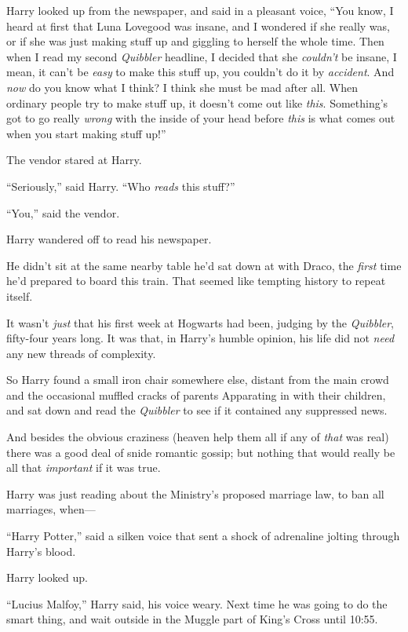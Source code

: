 Harry looked up from the newspaper, and said in a pleasant voice, “You know, I heard at first that Luna Lovegood was insane, and I wondered if she really was, or if she was just making stuff up and giggling to herself the whole time. Then when I read my second \emph{Quibbler} headline, I decided that she \emph{couldn’t} be insane, I mean, it can’t be \emph{easy} to make this stuff up, you couldn’t do it by \emph{accident}. And \emph{now} do you know what I think? I think she must be mad after all. When ordinary people try to make stuff up, it doesn’t come out like \emph{this}. Something’s got to go really \emph{wrong} with the inside of your head before \emph{this} is what comes out when you start making stuff up!”

The vendor stared at Harry.

“Seriously,” said Harry. “Who \emph{reads} this stuff?”

“You,” said the vendor.

Harry wandered off to read his newspaper.

He didn’t sit at the same nearby table he’d sat down at with Draco, the \emph{first} time he’d prepared to board this train. That seemed like tempting history to repeat itself.

It wasn’t \emph{just} that his first week at Hogwarts had been, judging by the \emph{Quibbler}, fifty-four years long. It was that, in Harry’s humble opinion, his life did not \emph{need} any new threads of complexity.

So Harry found a small iron chair somewhere else, distant from the main crowd and the occasional muffled cracks of parents Apparating in with their children, and sat down and read the \emph{Quibbler} to see if it contained any suppressed news.

And besides the obvious craziness (heaven help them all if any of \emph{that} was real) there was a good deal of snide romantic gossip; but nothing that would really be all that \emph{important} if it was true.

Harry was just reading about the Ministry’s proposed marriage law, to ban all marriages, when—

“Harry Potter,” said a silken voice that sent a shock of adrenaline jolting through Harry’s blood.

Harry looked up.

“Lucius Malfoy,” Harry said, his voice weary. Next time he was going to do the smart thing, and wait outside in the Muggle part of King’s Cross until 10:55\AM.

